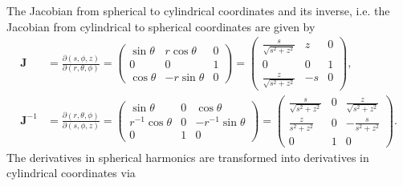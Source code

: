 The Jacobian from spherical to cylindrical coordinates and its inverse, i.e. the Jacobian from cylindrical to spherical coordinates are given by
\begin{equation}
\begin{aligned}    
    \mathbf{J} &= \frac{\partial (s, \phi, z)}{\partial (r, \theta, \phi)} = \begin{pmatrix}
        \sin\theta & r\cos\theta & 0 \\ 
        0 & 0 & 1 \\ 
        \cos\theta & -r\sin\theta & 0
    \end{pmatrix} = \begin{pmatrix}
        \frac{s}{\sqrt{s^2 + z^2}} & z & 0 \\
        0 & 0 & 1 \\
        \frac{z}{\sqrt{s^2 + z^2}} & -s & 0
    \end{pmatrix}, \\
    \mathbf{J}^{-1} &= \frac{\partial (r, \theta, \phi)}{\partial (s, \phi, z)} = \begin{pmatrix}
        \sin\theta & 0 & \cos\theta \\ 
        r^{-1} \cos\theta & 0 & -r^{-1}\sin\theta \\ 
        0 & 1 & 0
    \end{pmatrix}
    = \begin{pmatrix}
        \frac{s}{\sqrt{s^2 + z^2}} & 0 & \frac{z}{\sqrt{s^2 + z^2}} \\ 
        \frac{z}{s^2 + z^2} & 0 & - \frac{s}{s^2 + z^2} \\ 
        0 & 1 & 0
    \end{pmatrix}.
\end{aligned}
\end{equation}
The derivatives in spherical harmonics are transformed into derivatives in cylindrical coordinates via
